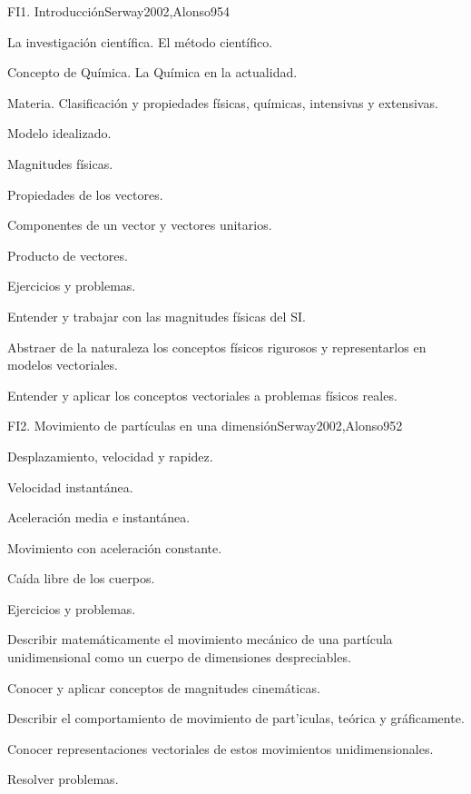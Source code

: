 \begin{sumilla}
\begin{unit}{FI1. Introducci\'on}{Serway2002,Alonso95}{4}
\begin{topicos}
      \item La investigaci\'on cient\'ifica. El m\'etodo cient\'ifico.
      \item Concepto de Qu\'imica. La Qu\'imica en la actualidad.
      \item Materia. Clasificaci\'on y propiedades f\'isicas, qu\'imicas, intensivas y extensivas.
      \item Modelo idealizado.
      \item Magnitudes f\'isicas.
      \item Propiedades de los vectores.
      \item Componentes de un vector y vectores unitarios.
      \item Producto de vectores.
      \item Ejercicios y problemas.
   \end{topicos}

   \begin{objetivos}
      \item Entender y trabajar con las magnitudes f\'isicas del SI.
      \item Abstraer de la naturaleza los conceptos f\'isicos rigurosos y
      representarlos en modelos vectoriales.
      \item Entender y aplicar los conceptos vectoriales a problemas f\'isicos reales.
   \end{objetivos}
\end{unit}

\begin{unit}{FI2. Movimiento de part\'iculas en una dimensi\'on}{Serway2002,Alonso95}{2}
\begin{topicos}
      \item Desplazamiento, velocidad y rapidez.
      \item Velocidad instant\'anea.
      \item Aceleraci\'on media e instant\'anea.
      \item Movimiento con aceleraci\'on constante.
      \item Ca\'ida libre de los cuerpos.
      \item Ejercicios y problemas.
    \end{topicos}
   \begin{objetivos}
      \item Describir matem\'aticamente el movimiento mec\'anico de una part\'icula unidimensional como un cuerpo de dimensiones despreciables.
      \item Conocer y aplicar conceptos de magnitudes cinem\'aticas.
      \item Describir el comportamiento de movimiento de part'iculas, te\'orica y gr\'aficamente.
      \item Conocer representaciones vectoriales de estos movimientos unidimensionales.
      \item Resolver problemas.
   \end{objetivos}
\end{unit}


\end{sumilla}
